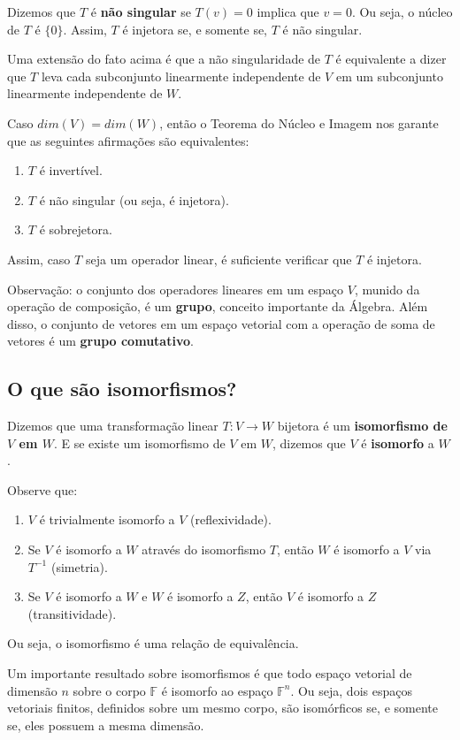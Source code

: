 \documentclass[12pt,a4paper]{article}
\begin{document}
Dizemos que $T$ é \textbf{não singular} se $T(v) = 0$ implica que $v = 0$. Ou seja, o núcleo de $T$ é $\{ 0 \}$. Assim, $T$ é injetora se, e somente se, $T$ é não singular.

Uma extensão do fato acima é que a não singularidade de $T$ é equivalente a dizer que $T$ leva cada subconjunto linearmente independente de $V$ em um subconjunto linearmente independente de $W$.

Caso $dim(V) = dim(W)$, então o Teorema do Núcleo e Imagem nos garante que as seguintes afirmações são equivalentes:

\begin{enumerate}
\item $T$ é invertível.
\item $T$ é não singular (ou seja, é injetora).
\item $T$ é sobrejetora.
\end{enumerate}

Assim, caso $T$ seja um operador linear, é suficiente verificar que $T$ é injetora.

Observação: o conjunto dos operadores lineares em um espaço $V$, munido da operação de composição, é um \textbf{grupo}, conceito importante da Álgebra. Além disso, o conjunto de vetores em um espaço vetorial com a operação de soma de vetores é um \textbf{grupo comutativo}.

\subsection{O que são isomorfismos?}

Dizemos que uma transformação linear $T:V \to W$ bijetora é um \textbf{isomorfismo de $V$ em $W$}.  E se existe um isomorfismo de $V$ em $W$, dizemos que $V$ é \textbf{isomorfo} a $W$.

Observe que:

\begin{enumerate}
\item $V$ é trivialmente isomorfo a $V$ (reflexividade).
\item Se $V$ é isomorfo a $W$ através do isomorfismo $T$, então $W$ é isomorfo a $V$ via $T^{-1}$ (simetria).
\item Se $V$ é isomorfo a $W$ e $W$ é isomorfo a $Z$, então $V$ é isomorfo a $Z$ (transitividade).
\end{enumerate}

Ou seja, o isomorfismo é uma relação de equivalência.

Um importante resultado sobre isomorfismos é que todo espaço vetorial de dimensão $n$ sobre o corpo $\mathbb{F}$ é isomorfo ao espaço $\mathbb{F}^n$. Ou seja, dois espaços vetoriais finitos, definidos sobre um mesmo corpo, são isomórficos se, e somente se, eles possuem a mesma dimensão.
\end{document}

